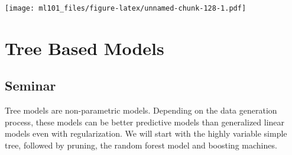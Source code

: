 \documentclass[]{article}
\newenvironment{Shaded}{\begin{snugshade}}{\end{snugshade}}
\newcommand{\DataTypeTok}[1]{\textcolor[rgb]{0.13,0.29,0.53}{#1}}
\newcommand{\DecValTok}[1]{\textcolor[rgb]{0.00,0.00,0.81}{#1}}
\newcommand{\KeywordTok}[1]{\textcolor[rgb]{0.13,0.29,0.53}{\textbf{#1}}}
\newcommand{\NormalTok}[1]{#1}
\newcommand{\OperatorTok}[1]{\textcolor[rgb]{0.81,0.36,0.00}{\textbf{#1}}}
\newcommand{\OtherTok}[1]{\textcolor[rgb]{0.56,0.35,0.01}{#1}}
\newcommand{\StringTok}[1]{\textcolor[rgb]{0.31,0.60,0.02}{#1}}
\begin{document}
\begin{Shaded}
\end{Shaded}

\texttt{[image: ml101\_files/figure-latex/unnamed-chunk-128-1.pdf]}

\hypertarget{tree-based-models}{%
\section{Tree Based Models}\label{tree-based-models}}

\hypertarget{seminar-5}{%
\subsection{Seminar}\label{seminar-5}}

Tree models are non-parametric models. Depending on the data generation process, these models can be better predictive models than generalized linear models even with regularization. We will start with the highly variable simple tree, followed by pruning, the random forest model and boosting machines.
\end{document}
